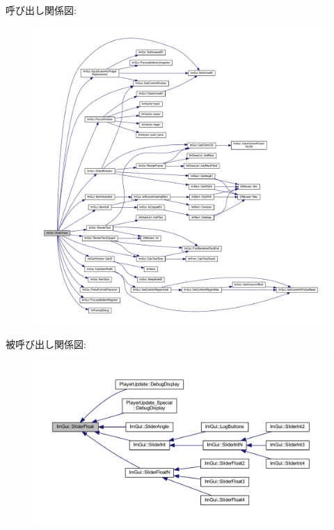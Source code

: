 呼び出し関係図\+:\nopagebreak
\begin{figure}[H]
\begin{center}
\leavevmode
\includegraphics[width=350pt]{namespace_im_gui_a7c12e66f74025376996b7ac6d1e3a476_cgraph}
\end{center}
\end{figure}
被呼び出し関係図\+:\nopagebreak
\begin{figure}[H]
\begin{center}
\leavevmode
\includegraphics[width=350pt]{namespace_im_gui_a7c12e66f74025376996b7ac6d1e3a476_icgraph}
\end{center}
\end{figure}
\mbox{\label{namespace_im_gui_a0d5270d08284202523130e8b6ef66350}} 
